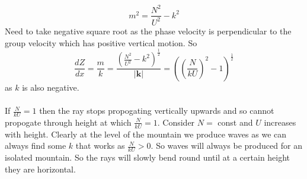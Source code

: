 \documentclass{article}
\begin{document}
$$
m^2 = \frac{N^2}{U^2} - k^2
$$
Need to take negative square root as the phase velocity is perpendicular to the group velocity which has positive vertical motion. So
$$
\frac{dZ}{dx} = \frac{m}{k} = \frac{ ( \frac{N^2}{U^2} - k^2)^{\frac{1}{2}}}{|\bm k|} =  ( (\frac{N}{k U})^2 - 1)^{\frac{1}{2}}
$$
as $k$ is also negative.\\\\
If $\frac{N}{kU} = 1$ then the ray stops propogating vertically upwards and so cannot propogate through height at which $\frac{N}{k U} =1$. Consider $N= $ const and $U$ increases with height. Clearly at the level of the mountain we produce waves as we can always find some $k$ that works as $\frac{N}{k U}> 0$. So waves will always be produced for an isolated mountain. So the rays will slowly bend round until at a certain height they are horizontal. 
\end{document}

